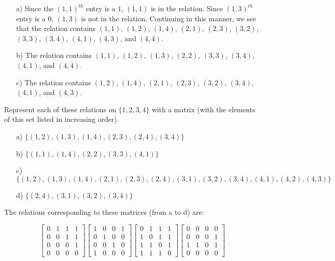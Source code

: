 \begin{solution}
	\begin{enumerate}
		\item[a)] Since the $(1,1)^{th}$ entry is a $1$, $(1,1)$ is in the relation. Since $(1,3)^{th}$ entry is a $0$, $(1,3)$ is not in the relation. Continuing in this manner, we see that the relation contains $(1,1)$, $(1,2)$, $(1,4)$, $(2,1)$, $(2,3)$, $(3,2)$, $(3,3)$, $(3,4)$, $(4,1)$, $(4,3)$, and $(4,4)$.
		\item[b)] The relation contains $(1,1)$, $(1,2)$, $(1,3)$, $(2,2)$, $(3,3)$, $(3,4)$, $(4,1)$, and $(4,4)$.
		\item[c)] The relation contains $(1,2)$, $(1,4)$, $(2,1)$, $(2,3)$, $(3,2)$, $(3,4)$, $(4,1)$, and $(4,3)$.
	\end{enumerate}
\end{solution}

\begin{exercise}
	Represent each of these relations on \(\{1, 2, 3, 4\}\) with a matrix (with the elements of this set listed in increasing order).
	\begin{enumerate}
		\item[a)] \(\{(1, 2), (1, 3), (1, 4), (2, 3), (2, 4), (3, 4)\}\)
		\item[b)] \(\{(1, 1), (1, 4), (2, 2), (3, 3), (4, 1)\}\)
		\item[c)] \(\{(1, 2), (1, 3), (1, 4), (2, 1), (2, 3), (2, 4), (3, 1), (3, 2), (3, 4), (4, 1), (4, 2), (4, 3)\}\)
		\item[d)] \(\{(2, 4), (3, 1), (3, 2), (3, 4)\}\)
	\end{enumerate}
\end{exercise}

\begin{solution}
	The relations corresponding to these matrices (from a to d) are:

		$$
		\begin{bmatrix}
			0 & 1 & 1 & 1 \\
			0 & 0 & 1 & 1 \\
			0 & 0 & 0 & 1 \\
			0 & 0 & 0 & 0
		\end{bmatrix}
		\begin{bmatrix}
			1 & 0 & 0 & 1 \\
			0 & 1 & 0 & 0 \\
			0 & 0 & 1 & 0 \\
			1 & 0 & 0 & 0
		\end{bmatrix}
		\begin{bmatrix}
			0 & 1 & 1 & 1 \\
			1 & 0 & 1 & 1 \\
			1 & 1 & 0 & 1 \\
			1 & 1 & 1 & 0
		\end{bmatrix}
		\begin{bmatrix}
			0 & 0 & 0 & 0 \\
			0 & 0 & 0 & 1 \\
			1 & 1 & 0 & 1 \\
			0 & 0 & 0 & 0
		\end{bmatrix}
		$$
		

\end{solution}

